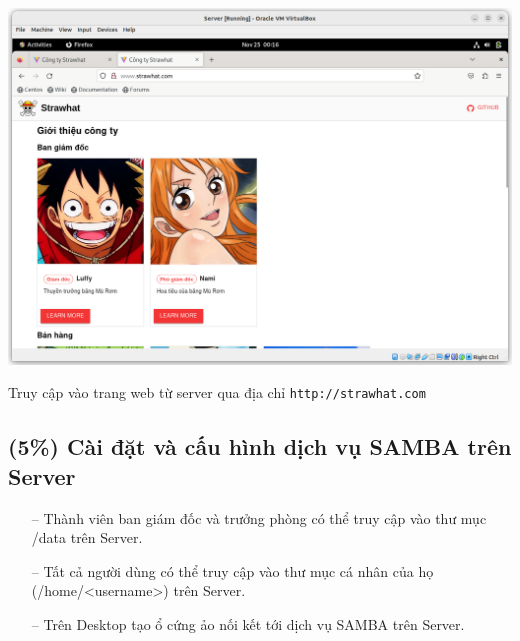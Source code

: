 \documentclass[a4paper, 11pt]{article}
\begin{document}
\begin{minipage}
    {\linewidth}
    \captionsetup{type=figure}
    \centering
    \includegraphics[width=\linewidth]{images/server-strawhat-com.png}
    \caption{Truy cập vào trang web từ server qua địa chỉ \texttt{http://strawhat.com}}
    \label{figure:server-strawhat-com}
\end{minipage}

\subsection{(5\%) Cài đặt và cấu hình dịch vụ SAMBA trên Server}

\begin{itemize}
    \item[--] Thành viên ban giám đốc và trưởng phòng có thể truy cập vào thư mục /data trên Server.
    \item[--] Tất cả người dùng có thể truy cập vào thư mục cá nhân của họ (/home/<username>) trên Server.
    \item[--] Trên Desktop tạo ổ cứng ảo nối kết tới dịch vụ SAMBA trên Server.
\end{itemize}
\end{document}
